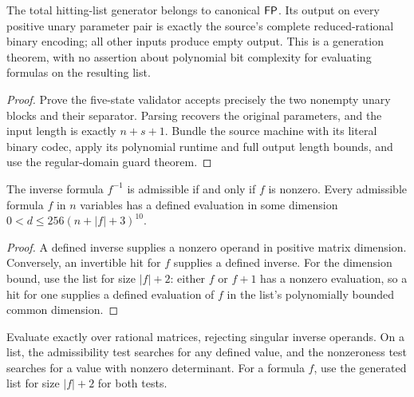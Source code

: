 \begin{theorem}
  \label{thm:rational-generator-fp}
  \leanok
  The total hitting-list generator belongs to canonical $\mathsf{FP}$. Its
  output on every positive unary parameter pair is exactly the source's
  complete reduced-rational binary encoding; all other inputs produce
  empty output. This is a generation theorem, with no assertion about
  polynomial bit complexity for evaluating formulas on the resulting list.
\end{theorem}
\begin{proof}
  \leanok
  Prove the five-state validator accepts precisely the two nonempty unary
  blocks and their separator. Parsing recovers the original parameters,
  and the input length is exactly $n+s+1$. Bundle the source machine with
  its literal binary codec, apply its polynomial runtime and full output
  length bounds, and use the regular-domain guard theorem.
\end{proof}

\begin{theorem}
  \label{thm:rational-inverse-domain}
  \leanok
  The inverse formula $f^{-1}$ is admissible if and only if $f$ is nonzero.
  Every admissible formula $f$ in $n$ variables has a defined evaluation
  in some dimension $0<d\leq 256(n+|f|+3)^{10}$.
\end{theorem}
\begin{proof}
  \leanok
  A defined inverse supplies a nonzero operand in positive matrix dimension.
  Conversely, an invertible hit for $f$ supplies a defined inverse.
  For the dimension bound, use the list for size $|f|+2$: either $f$ or $f+1$
  has a nonzero evaluation, so a hit for one supplies a defined evaluation
  of $f$ in the list's polynomially bounded common dimension.
\end{proof}

\begin{definition}
  \label{def:rational-finite-tests}
  \leanok
  Evaluate exactly over rational matrices, rejecting singular inverse operands.
  On a list, the admissibility test searches for any defined value, and the
  nonzeroness test searches for a value with nonzero determinant. For a formula
  $f$, use the generated list for size $|f|+2$ for both tests.
\end{definition}

